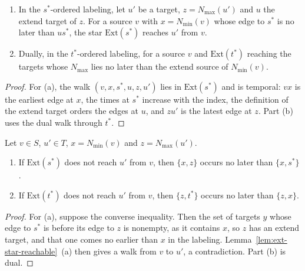 \begin{lemma}
  \label{lem:ext-star-reachable}
  \leanok
  \begin{enumerate}
  \item[(a)] In the $s^*$-ordered labeling, let $u'$ be a target,
    $z = N_{\max}(u')$ and $u$ the extend target of $z$. For a source $v$ with
    $x = N_{\min}(v)$ whose edge to $s^*$ is no later than $u s^*$, the star
    $\mathrm{Ext}(s^*)$ reaches $u'$ from $v$.
  \item[(b)] Dually, in the $t^*$-ordered labeling, for a source $v$ and
    $\mathrm{Ext}(t^*)$ reaching the targets whose $N_{\max}$ lies no later
    than the extend source of $N_{\min}(v)$.
  \end{enumerate}
\end{lemma}

\begin{proof}
  \leanok
  For (a), the walk $(v, x, s^*, u, z, u')$ lies in $\mathrm{Ext}(s^*)$ and is
  temporal: $vx$ is the earliest edge at $x$, the times at $s^*$ increase with
  the index, the definition of the extend target orders the edges at $u$, and
  $zu'$ is the latest edge at $z$. Part (b) uses the dual walk through $t^*$.
\end{proof}

\begin{lemma}
  \label{lem:ext-star-not-reachable}
  \leanok
  Let $v \in S$, $u' \in T$, $x = N_{\min}(v)$ and $z = N_{\max}(u')$.
  \begin{enumerate}
  \item[(a)] If $\mathrm{Ext}(s^*)$ does not reach $u'$ from $v$, then
    $\{x, z\}$ occurs no later than $\{x, s^*\}$.
  \item[(b)] If $\mathrm{Ext}(t^*)$ does not reach $u'$ from $v$, then
    $\{z, t^*\}$ occurs no later than $\{z, x\}$.
  \end{enumerate}
\end{lemma}

\begin{proof}
  \leanok
  For (a), suppose the converse inequality. Then the set of targets $y$ whose
  edge to $s^*$ is before its edge to $z$ is nonempty, as it contains $x$, so
  $z$ has an extend target, and that one comes no earlier than $x$ in the
  labeling. Lemma~\ref{lem:ext-star-reachable}~(a) then gives a walk from $v$
  to $u'$, a contradiction. Part (b) is dual.
\end{proof}

